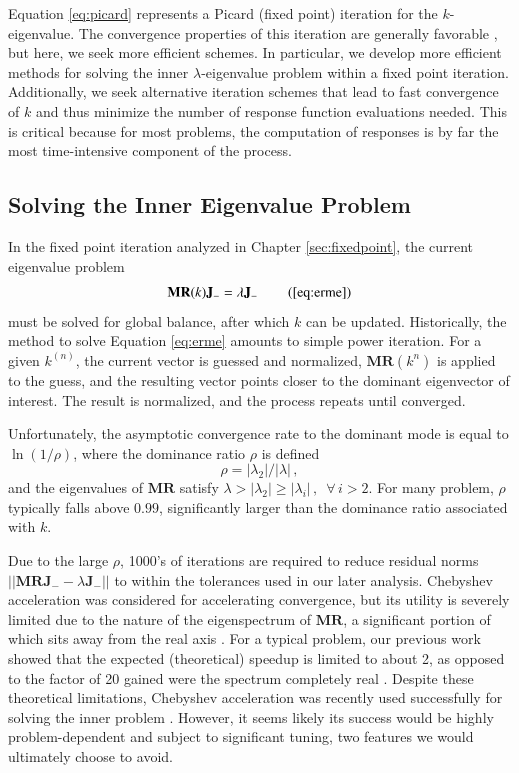Equation \ref{eq:picard} represents a Picard (fixed point) iteration
for the $k$-eigenvalue. The convergence properties of this iteration
are generally favorable \cite{robertsXXX}, but here, we seek more 
efficient schemes.  In particular, we develop more efficient 
methods for solving the 
inner $\lambda$-eigenvalue 
problem within a fixed point iteration.  Additionally,
we seek alternative iteration schemes that lead to fast convergence of 
$k$ and thus minimize the number of response function evaluations needed.
This is critical because for most problems, the computation of responses 
is by far the most time-intensive component of the process.

\subsection{Solving the Inner Eigenvalue Problem}

In the fixed point iteration analyzed in Chapter \ref{sec:fixedpoint}, 
the current eigenvalue problem 
\begin{equation}
   \oper{M}\mathbf{R}(k)\mathbf{J_-}  = \lambda \mathbf{J_-} \, 
   \tag{\ref{eq:erme}}
\end{equation}
must be solved for global balance, after which $k$ can be updated.
Historically, the method to solve Equation \ref{eq:erme} amounts to 
simple power iteration.
For a given $k^{(n)}$, the current vector is guessed and normalized, 
$\mathbf{MR}(k^{n})$ is applied to the guess, and the resulting vector 
points closer to the dominant eigenvector of interest.  The result 
is normalized, and the process repeats until converged. 

Unfortunately, the asymptotic convergence rate to the dominant mode is 
equal to $\ln{(1/\rho)}$, where the dominance ratio $\rho$  is defined
\begin{equation}
 \rho = |\lambda_2| / |\lambda| \, ,
\end{equation}
and the eigenvalues of 
$\mathbf{M}\mathbf{R}$ satisfy 
$\lambda > |\lambda_2| \geq |\lambda_i| \, , \,\,\, \forall \, i > 2$.  
For many problem, $\rho$ typically falls 
above $0.99$, significantly larger than the dominance ratio associated 
with $k$.

Due to the large $\rho$, 1000's of iterations are required to reduce 
residual norms $||\mathbf{MRJ}_- - \lambda \mathbf{J}_-||$ to within the
tolerances used in our later analysis.  
Chebyshev acceleration 
was considered for accelerating convergence, but its utility is severely 
limited due to the nature of the eigenspectrum of $\mathbf{MR}$, a 
significant portion of which sits away from the real axis .  
For a typical problem, our previous work 
showed that the expected (theoretical) speedup is limited to 
about 2, as opposed to the factor of 20 gained were the spectrum 
completely real \cite{roberts2012ksi}.
Despite these theoretical limitations, 
Chebyshev acceleration was recently used successfully for solving the inner 
problem \cite{zhang2012ehs}.  However, it seems likely its success would 
be highly problem-dependent and subject to significant tuning, two 
features we would ultimately choose to avoid.


